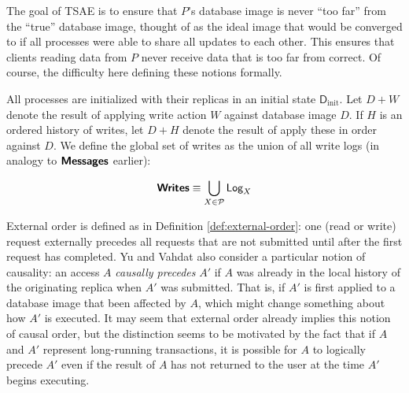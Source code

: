 \documentclass[]             %
{NASA}                       %
\theoremstyle{definition}
\begin{document}
The goal of TSAE is to ensure that $P$'s database image is never ``too
far'' from the ``true'' database image, thought of as the ideal image
that would be converged to if all processes were able to share all
updates to each other. This ensures that clients reading data from $P$
never receive data that is too far from correct. Of course, the
difficulty here defining these notions formally.

All processes are initialized with their replicas in an initial state
$\mathsf{D}_{\textrm{init}}$. Let $D + W$ denote the result of
applying write action $W$ against database image $D$. If $H$ is an
ordered history of writes, let $D + H$ denote the result of apply
these in order against $D$. We define the global set of writes as the
union of all write logs (in analogy to $\textbf{\textsf{Messages}}$ earlier):

\[ \textbf{\textsf{Writes}} \equiv \bigcup_{X \in \mathcal{P}} \textsf{Log}_{X}\]

External order is defined as in Definition \ref{def:external-order}:
one (read or write) request externally precedes all requests that are
not submitted until after the first request has completed. Yu and
Vahdat also consider a particular notion of causality: an access $A$
\emph{causally precedes} $A'$ if $A$ was already in the local history
of the originating replica when $A'$ was submitted. That is, if $A'$
is first applied to a database image that been affected by $A$, which
might change something about how $A'$ is executed. It may seem that
external order already implies this notion of causal order, but the
distinction seems to be motivated by the fact that if $A$ and $A'$
represent long-running transactions, it is possible for $A$ to
logically precede $A'$ even if the result of $A$ has not returned to
the user at the time $A'$ begins executing.

\end{document}
